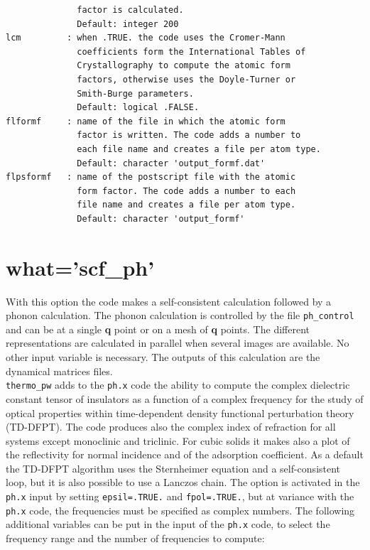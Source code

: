 \documentclass[12pt,a4paper,twoside]{report}
\begin{document}
\begin{verbatim}
              factor is calculated.
              Default: integer 200
lcm         : when .TRUE. the code uses the Cromer-Mann 
              coefficients form the International Tables of 
              Crystallography to compute the atomic form 
              factors, otherwise uses the Doyle-Turner or 
              Smith-Burge parameters.
              Default: logical .FALSE.
flformf     : name of the file in which the atomic form 
              factor is written. The code adds a number to 
              each file name and creates a file per atom type.
              Default: character 'output_formf.dat'
flpsformf   : name of the postscript file with the atomic 
              form factor. The code adds a number to each 
              file name and creates a file per atom type.
              Default: character 'output_formf'
\end{verbatim}

\newpage
{\color{coral}\section{what='scf\_ph'}}
\color{black}
With this option the code makes a self-consistent calculation followed
by a phonon calculation. The phonon calculation is controlled by the file
\texttt{ph\_control} and can be at a single {\bf q} point or on a mesh of 
{\bf q} points. 
The different representations are calculated in parallel when several images 
are available. No other input variable is necessary. The outputs of this 
calculation are the dynamical matrices files. \\
\texttt{thermo\_pw} adds to the \texttt{ph.x} code the ability to
compute the complex dielectric constant tensor of insulators as a function 
of a complex frequency for the study of optical properties within 
time-dependent density functional perturbation theory (TD-DFPT). 
The code produces also the complex index of refraction for all
systems except monoclinic and triclinic. For cubic solids it makes
also a plot of the reflectivity for normal incidence and of the
adsorption coefficient.
As a default the TD-DFPT algorithm uses the Sternheimer equation and 
a self-consistent loop, but it is also possible to use a Lanczos chain.
The option is activated in the \texttt{ph.x} input by setting 
\texttt{epsil=.TRUE.} and \texttt{fpol=.TRUE.}, but at variance with
the \texttt{ph.x} code, the frequencies must be specified as complex numbers.
The following additional variables can be put in the input of the \texttt{ph.x}
code, to select the frequency range and the number of frequencies to compute:
\end{document}
